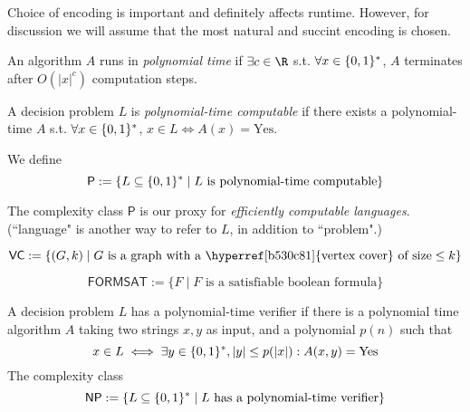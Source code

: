 Choice of encoding is important and definitely affects runtime.
However, for discussion we will assume that the most natural and
succint encoding is chosen.


An algorithm $A$ runs in \textit{polynomial time} if $\exists c\in\R$
s.t. $\forall x\in\{0,1\}^*$, $A$ terminates after $O(|x|^c)$
computation steps.

A decision problem $L$ is \textit{polynomial-time computable} if there
exists a polynomial-time $A$ s.t. $\forall x\in\{0,1\}^*$, $x\in L\iff
	A(x)=\text{Yes}$.

We define
$$
	\mathsf P:=\{L\subseteq\{0,1\}^*\mid L\text{ is polynomial-time computable}\}
$$

The complexity class $\mathsf P$ is our proxy for \textit{efficiently
	computable languages}. (``language" is another way to refer to $L$, in
addition to ``problem".)


$$
	\mathsf{VC}:=\{(G,k)\mid G\text{ is a graph with a
		\hyperref[b530c81]{vertex cover} of size}\leq k\}
$$


$$
	\mathsf{FORMSAT}:=\{F\mid F\text{ is a satisfiable boolean formula}\}
$$


A decision problem $L$ has a polynomial-time verifier if there is a
polynomial time algorithm $A$ taking two strings $x,y$ as input, and a
polynomial $p(n)$ such that
$$
	x\in L\iff\exists y\in\{0,1\}^*,|y|\leq p(|x|):A(x,y)=\text{Yes}
$$
The complexity class
$$
	\mathsf{NP}:=\{L\subseteq\{0,1\}^*\mid L\text{ has a polynomial-time verifier}\}
$$
